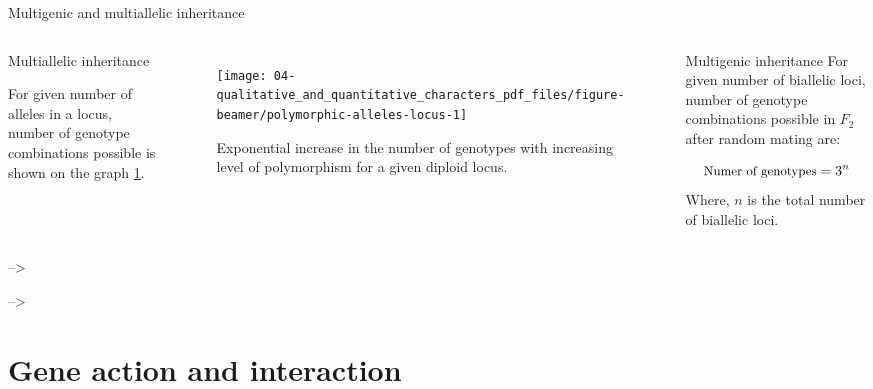 \documentclass[11pt,ignorenonframetext,aspectratio=169]{beamer}
\begin{document}
\begin{frame}{Multigenic and multiallelic inheritance}
\protect\hypertarget{multigenic-and-multiallelic-inheritance}{}
\begin{columns}[T, onlytextwidth]


\begin{block}{Multiallelic inheritance}

For given number of alleles in a locus, number of genotype combinations possible is shown on the graph \ref{fig:polymorphic-alleles-locus}.
\end{block}

\begin{figure}

{\centering \texttt{[image: 04-qualitative\_and\_quantitative\_characters\_pdf\_files/figure-beamer/polymorphic-alleles-locus-1]} 

}

\caption{Exponential increase in the number of genotypes with increasing level of polymorphism for a given diploid locus.}\label{fig:polymorphic-alleles-locus}
\end{figure}

\hspace{-0.4cm}
\begin{block}{Multigenic inheritance}
\small
For given number of biallelic loci, number of genotype combinations possible in $F_2$ after random mating are:

$$
\small
\text{Numer of genotypes} = 3^n
$$
Where, $n$ is the total number of biallelic loci. 
\end{block}
\end{columns}

--\textgreater{}

--\textgreater{}
\end{frame}

\hypertarget{gene-action-and-interaction}{%
\section{Gene action and
interaction}\label{gene-action-and-interaction}}
\end{document}
